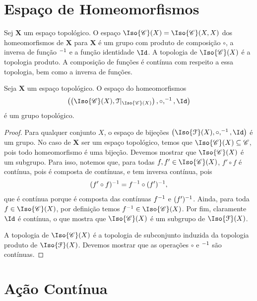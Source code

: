 \section{Espaço de Homeomorfismos}

Sej $\bm X$ um espaço topológico. O espaço $\Iso{\cont}(X) = \Iso{\cont}(X,X)$ dos homeomorfismos de $\bm X$ para $\bm X$ é um grupo com produto de composição $\circ$, a inversa de função $^{-1}$ e a função identidade $\Id$. A topologia de $\Iso{\cont}(X)$ é a topologia produto. A composição de funções é contínua com respeito a essa topologia, bem como a inversa de funções.

\begin{prop}
Seja $\bm X$ um espaço topológico. O espaço do homeomorfismos
	\begin{equation*}
	\left( \left( \Iso{\cont}(X),\topo|_{\Iso{\cont}(X)} \right),\circ,\inv,\Id \right)
	\end{equation*}
é um grupo topológico.
\end{prop}
\begin{proof}
Para qualquer conjunto $X$, o espaço de bijeções $\left( \Iso{\mathcal F}(X),\circ,\inv,\Id \right)$ é um grupo. No caso de $\bm X$ ser um espaço topológico, temos que $\Iso{\cont}(X) \subseteq \cont$, pois todo homeomorfismo é uma bijeção. Devemos mostrar que $\Iso{\cont}(X)$ é um subgrupo. Para isso, notemos que, para todas $f,f' \in \Iso{\cont}(X)$, $f' \circ f$ é contínua, pois é composta de contínuas, e tem inversa contínua, pois
	\begin{equation*}
	(f' \circ f)^{-1} = f^{-1} \circ (f')^{-1},
	\end{equation*}
que é contínua porque é composta das contínuas $f^{-1}$ e $(f')^{-1}$. Ainda, para toda $f \in \Iso{\cont}(X)$, por definição temos $f\inv \in \Iso{\cont}(X)$. Por fim, claramente $\Id$ é contínua, o que mostra que $\Iso{\cont}(X)$ é um subgrupo de $\Iso{\mathcal F}(X)$.

A topologia de $\Iso{\cont}(X)$ é a topologia de subconjunto induzida da topologia produto de $\Iso{\mathcal F}(X)$. Devemos mostrar que as operações $\circ$ e $^{-1}$ são contínuas.
\end{proof}

\section{Ação Contínua}

